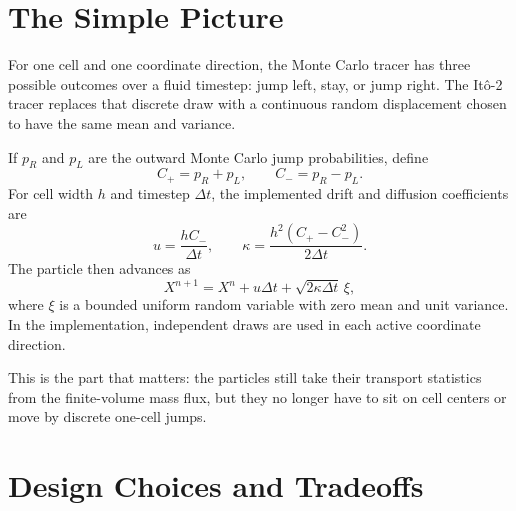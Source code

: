\documentclass[11pt]{article}
\newcommand{\Ito}{It\^o}
\begin{document}
\section{The Simple Picture}

For one cell and one coordinate direction, the Monte Carlo tracer has three
possible outcomes over a fluid timestep: jump left, stay, or jump right. The
\Ito{}-2 tracer replaces that discrete draw with a continuous random
displacement chosen to have the same mean and variance.

If \(p_R\) and \(p_L\) are the outward Monte Carlo jump probabilities, define
\begin{equation}
  C_+ = p_R + p_L,
  \qquad
  C_- = p_R - p_L .
\end{equation}
For cell width \(h\) and timestep \(\Delta t\), the implemented drift and
diffusion coefficients are
\begin{equation}
  u = \frac{h C_-}{\Delta t},
  \qquad
  \kappa = \frac{h^2\left(C_+ - C_-^2\right)}{2\Delta t}.
\end{equation}
The particle then advances as
\begin{equation}
  X^{n+1} = X^n + u\Delta t
    + \sqrt{2\kappa\Delta t}\,\xi ,
\end{equation}
where \(\xi\) is a bounded uniform random variable with zero mean and unit
variance. In the implementation, independent draws are used in each active
coordinate direction.

This is the part that matters: the particles still take their transport
statistics from the finite-volume mass flux, but they no longer have to sit on
cell centers or move by discrete one-cell jumps.

\section{Design Choices and Tradeoffs}
\end{document}
